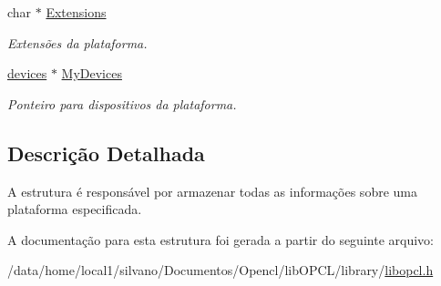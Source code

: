 \begin{DoxyCompactItemize}
char $\ast$ \hyperlink{structplataforms_a04797e250a09482a400749add9f8862e}{Extensions}
\begin{DoxyCompactList}\small\item\em Extensões da plataforma. \end{DoxyCompactList}\item 
\hypertarget{structplataforms_adcd439f5e569e26a6614e6ab344d72d2}{}\label{structplataforms_adcd439f5e569e26a6614e6ab344d72d2} 
\hyperlink{structdevices}{devices} $\ast$ \hyperlink{structplataforms_adcd439f5e569e26a6614e6ab344d72d2}{My\+Devices}
\begin{DoxyCompactList}\small\item\em Ponteiro para dispositivos da plataforma. \end{DoxyCompactList}\end{DoxyCompactItemize}


\subsection{Descrição Detalhada}
A estrutura é responsável por armazenar todas as informações sobre uma plataforma especificada. 

A documentação para esta estrutura foi gerada a partir do seguinte arquivo\+:\begin{DoxyCompactItemize}
\item 
/data/home/local1/silvano/\+Documentos/\+Opencl/lib\+O\+P\+C\+L/library/\hyperlink{libopcl_8h}{libopcl.\+h}\end{DoxyCompactItemize}
